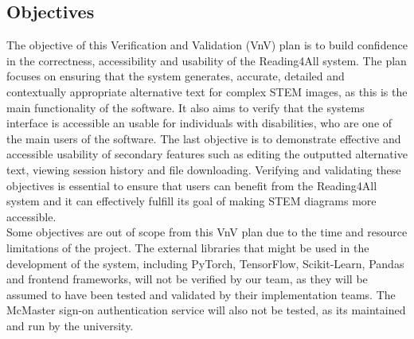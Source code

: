\documentclass[12pt, titlepage]{article}
\begin{document}
\subsection{Objectives}






The objective of this Verification and Validation (VnV) plan is to build confidence in the correctness, accessibility and usability of the Reading4All system. 
The plan focuses on ensuring that the system generates, accurate, detailed and contextually appropriate alternative text for complex STEM images, as this is the main functionality of the software. 
It also aims to verify that the systems interface is accessible an usable for individuals with disabilities, who are one of the main users of the software. The last objective is to demonstrate effective and accessible usability of secondary features
such as editing the outputted alternative text, viewing session history and file downloading. 
Verifying and validating these objectives is essential to ensure that users can benefit from the Reading4All system and 
it can effectively fulfill its goal of making STEM diagrams more accessible.
\\

Some objectives are out of scope from this VnV plan due to the time and resource limitations of the project.
The external libraries that might be used in the development of the system, including PyTorch, TensorFlow, Scikit-Learn, Pandas and frontend frameworks, will not be verified by our team, as they will be assumed to have been tested and validated by their implementation teams. 
The McMaster sign-on authentication service will also not be tested, as its maintained and run by the university.
\end{document}
